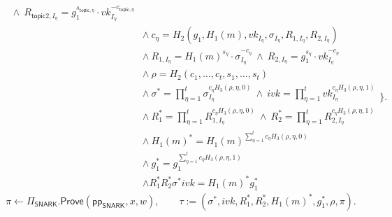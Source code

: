 \documentclass{article}
\newcommand{\ppSNARK}[0]{\mathsf{pp}_{\mathsf{SNARK}}}
\newcommand{\topic}[0]{\mathsf{topic}}
\begin{document}
\begin{itemize}
\begin{equation}
\begin{aligned}
            \ \land\ R_{\topic2,I_\eta}=g_1^{s_{\topic,\eta}}\cdot vk_{I_\eta}^{-c_{\topic,\eta}}\\
            &\land\ c_\eta = H_2(g_1,H_1(m),vk_{I_\eta},\sigma_{I_\eta},R_{1,I_\eta},R_{2,I_\eta})\\
            &\land\ R_{1,I_\eta}=H_1(m)^{s_\eta}\cdot \sigma_{I_\eta}^{-c_\eta}\ \land\ R_{2,I_\eta}=g_1^{s_\eta}\cdot vk_{I_\eta}^{-c_\eta}\\
            &\land\ \rho = H_2(c_1,\ldots,c_t,s_1,\ldots,s_t)\\
            &\land\ \sigma^* = \prod_{\eta=1}^{t} \sigma_{I_\eta}^{c_\eta H_3(\rho,\eta,0)}\ \land\ ivk = \prod_{\eta=1}^{t} vk_{I_\eta}^{c_\eta H_3(\rho,\eta,1)}\\
            &\land\ R_1^* = \prod_{\eta=1}^{t} R_{1,I_\eta}^{c_\eta H_3(\rho,\eta,0)}\ \land\ R_2^* = \prod_{\eta=1}^{t} R_{2,I_\eta}^{c_\eta H_3(\rho,\eta,1)}\\
            &\land\ H_1(m)^* = H_1(m)^{\sum_{\eta=1}^{t} c_\eta H_3(\rho,\eta,0)}\ \\
            &\land\ g_1^* = g_1^{\sum_{\eta=1}^{t} c_\eta H_3(\rho,\eta,1)}\\
            &\land R_1^* R_2^* \sigma^* ivk = H_1(m)^* g_1^*
          \end{aligned}
          \Bigr\}.
          \end{equation}
          \newline
          \[
            \pi \leftarrow \Pi_{\mathsf{SNARK}}.\mathsf{Prove}(\ppSNARK,x,w),
            \qquad
            \tau := (\sigma^*,ivk,R_1^*,R_2^*,H_1(m)^*,g_1^*,\rho,\pi).
          \]




\end{itemize}
\end{document}
